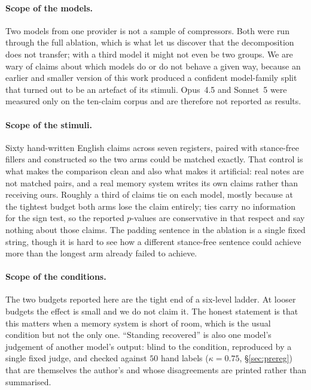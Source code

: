 \documentclass[11pt]{article}
\begin{document}
\paragraph{Scope of the models.} Two models from one provider is not a sample of
compressors. Both were run through the full ablation, which is what let us discover that
the decomposition does not transfer; with a third model it might not even be two groups.
We are wary of claims about which models do or do not behave a given way, because an
earlier and smaller version of this work produced a confident model-family split that
turned out to be an artefact of its stimuli. Opus~4.5 and Sonnet~5 were measured only on
the ten-claim corpus and are therefore not reported as results.

\paragraph{Scope of the stimuli.} Sixty hand-written English claims across seven
registers, paired with stance-free fillers and constructed so the two arms could be
matched exactly. That control is what makes the comparison clean and also what makes it
artificial: real notes are not matched pairs, and a real memory system writes its own
claims rather than receiving ours. Roughly a third of claims tie on each model, mostly
because at the tightest budget both arms lose the claim entirely; ties carry no
information for the sign test, so the reported $p$-values are conservative in that
respect and say nothing about those claims. The padding sentence in the ablation is a
single fixed string, though it is hard to see how a different stance-free sentence could
achieve more than the longest arm already failed to achieve.

\paragraph{Scope of the conditions.} The two budgets reported here are the tight end of a
six-level ladder. At looser budgets the effect is small and we do not claim it. The honest
statement is that this matters when a memory system is short of room, which is the usual
condition but not the only one. ``Standing recovered'' is also one model's judgement of
another model's output: blind to the condition, reproduced by a single fixed judge, and
checked against $50$ hand labels ($\kappa=0.75$, \S\ref{sec:prereg}) that are themselves
the author's and whose disagreements are printed rather than summarised.
\end{document}

